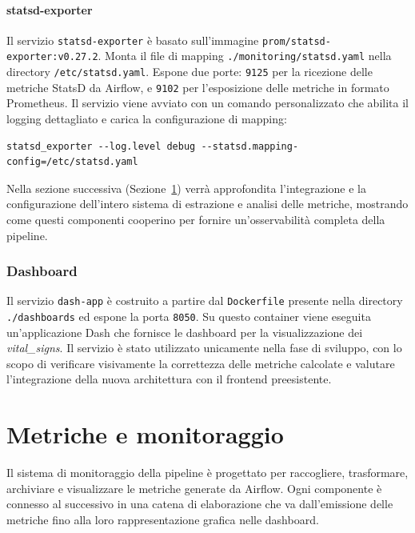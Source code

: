 \paragraph{statsd-exporter}
Il servizio \texttt{statsd-exporter} è basato sull’immagine \texttt{prom/statsd-exporter:v0.27.2}.  
Monta il file di mapping \texttt{./monitoring/statsd.yaml} nella directory \texttt{/etc/statsd.yaml}.  
Espone due porte: \texttt{9125} per la ricezione delle metriche StatsD da Airflow, e \texttt{9102} per l’esposizione delle metriche in formato Prometheus.  
Il servizio viene avviato con un comando personalizzato che abilita il logging dettagliato e carica la configurazione di mapping:
\begin{verbatim}
statsd_exporter --log.level debug --statsd.mapping-config=/etc/statsd.yaml
\end{verbatim}

Nella sezione successiva (Sezione~\ref{sec:implmonitoring}) verrà approfondita l’integrazione e la configurazione dell’intero sistema di estrazione e analisi delle metriche, mostrando come questi componenti cooperino per fornire un’osservabilità completa della pipeline.


\subsubsection{Dashboard}

Il servizio \texttt{dash-app} è costruito a partire dal \texttt{Dockerfile} presente nella directory \texttt{./dashboards} ed espone la porta \texttt{8050}.  
Su questo container viene eseguita un’applicazione Dash che fornisce le dashboard per la visualizzazione dei \textit{vital\_signs}.  
Il servizio è stato utilizzato unicamente nella fase di sviluppo, con lo scopo di verificare visivamente la correttezza delle metriche calcolate e valutare l’integrazione della nuova architettura con il frontend preesistente.  

\section{Metriche e monitoraggio}
\label{sec:implmonitoring}


Il sistema di monitoraggio della pipeline è progettato per raccogliere, trasformare, archiviare e visualizzare le metriche generate da Airflow.  
Ogni componente è connesso al successivo in una catena di elaborazione che va dall’emissione delle metriche fino alla loro rappresentazione grafica nelle dashboard.  

